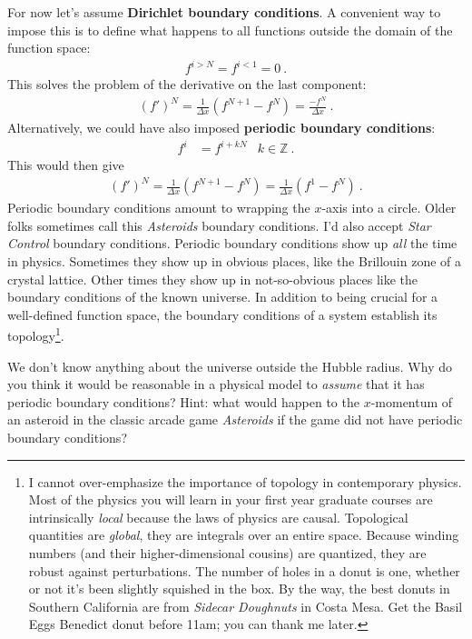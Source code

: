 %
For now let’s assume \textbf{Dirichlet boundary conditions}. A convenient way to impose this is to define what happens to all functions outside the domain of the function space:
\begin{align}
  f^{i > N} = f^{i < 1} = 0 \ .
\end{align}
This solves the problem of the derivative on the last component:
\begin{align}
  {(f')}^N = \frac{1}{\Delta x}(f^{N+1} - f^N) 
  = 
  \frac{- f^N}{\Delta x}  \ .
\end{align}
Alternatively, we could have also imposed \textbf{periodic boundary conditions}:
\begin{align}
  f^{i} &= f^{i+ kN}
  & k\in \mathbb{Z} \ .
\end{align}
This would then give
\begin{align}
  {(f')}^N = \frac{1}{\Delta x}(f^{N+1} - f^N) 
  = 
  \frac{1}{\Delta x}(f^{1} - f^N) 
  \ .
\end{align}
Periodic boundary conditions amount to wrapping the $x$-axis into a circle. Older folks sometimes call this \emph{Asteroids} boundary conditions. I'd also accept \emph{Star Control} boundary conditions. Periodic boundary conditions show up \emph{all} the time in physics. Sometimes they show up in obvious places, like the Brillouin zone of a crystal lattice. Other times they show up in not-so-obvious places like the boundary conditions of the known universe. In addition to being crucial for a well-defined function space, the boundary conditions of a system establish its topology\footnote{I cannot over-emphasize the importance of topology in contemporary physics. Most of the physics you will learn in your first year graduate courses are intrinsically \emph{local} because the laws of physics are causal. Topological quantities are \emph{global}, they are integrals over an entire space. Because winding numbers (and their higher-dimensional cousins) are quantized, they are robust against perturbations. The number of holes in a donut is one, whether or not it's been slightly squished in the box. By the way, the best donuts in Southern California are from \emph{Sidecar Doughnuts} in Costa Mesa. Get the Basil Eggs Benedict donut before 11am; you can thank me later.}.

\begin{exercise}
We don't know anything about the universe outside the Hubble radius. Why do you think it would be reasonable in a physical model to \emph{assume} that it has periodic boundary conditions? Hint: what would happen to the $x$-momentum of an asteroid in the classic arcade game \emph{Asteroids} if the game did not have periodic boundary conditions? 
\end{exercise}

